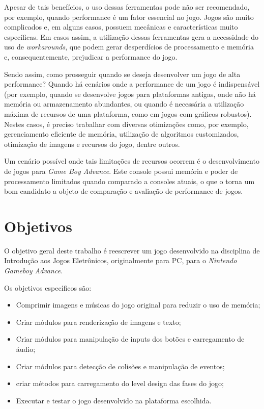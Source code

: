 Apesar de tais benefícios, o uso dessas ferramentas pode não ser recomendado, por exemplo, quando performance é um fator essencial no jogo. Jogos são muito complicados e, em alguns casos, possuem mecânicas e características muito específicas. Em casos assim, a utilização dessas ferramentas gera a necessidade do uso de \textit{workarounds}, que podem gerar desperdícios de processamento e memória e, consequentemente, prejudicar a performance do jogo.

Sendo assim, como prosseguir quando se deseja desenvolver um jogo de alta performance? Quando há cenários onde a performance de um jogo é indispensável (por exemplo, quando se desenvolve jogos para plataformas antigas, onde não há memória ou armazenamento abundantes, ou quando é necessária a utilização máxima de recursos de uma plataforma, como em jogos com gráficos robustos). Nestes casos, é preciso trabalhar com diversas otimizações como, por exemplo, gerenciamento eficiente de memória, utilização de algoritmos customizados, otimização de imagens e recursos do jogo, dentre outros.

Um cenário possível onde tais limitações de recursos ocorrem é o desenvolvimento de jogos para \textit{Game Boy Advance}. Este console possui memória e poder de processamento limitados quando comparado a consoles atuais, o que o torna um bom candidato a objeto de comparação e avaliação de performance de jogos.

\section{Objetivos}

O objetivo geral deste trabalho é reescrever um jogo desenvolvido na disciplina de Introdução aos Jogos Eletrônicos, originalmente para PC, para o \textit{Nintendo Gameboy Advance}.

Os objetivos específicos são:

\begin{itemize}
\item Comprimir imagens e músicas do jogo original para reduzir o uso de memória;
\item Criar módulos para renderização de imagens e texto;
\item Criar módulos para manipulação de inputs dos botões e carregamento de áudio;
\item Criar módulos para detecção de colisões e manipulação de eventos;
\item criar métodos para carregamento do level design das fases do jogo;
\item Executar e testar o jogo desenvolvido na plataforma escolhida.
\end{itemize}

